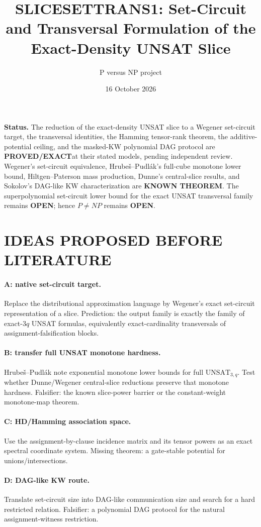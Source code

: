 \documentclass[11pt]{article}
\title{SLICESETTRANS1: Set-Circuit and Transversal Formulation of the Exact-Density UNSAT Slice}
\author{P versus NP project}
\date{16 October 2026}
\newcommand{\EXACT}{\textbf{PROVED/EXACT}}
\newcommand{\KNOWN}{\textbf{KNOWN THEOREM}}
\newcommand{\OPEN}{\textbf{OPEN}}
\begin{document}
\maketitle

\noindent\textbf{Status.} The reduction of the exact-density UNSAT slice to a Wegener set-circuit target, the transversal identities, the Hamming tensor-rank theorem, the additive-potential ceiling, and the masked-KW polynomial DAG protocol are \EXACT at their stated models, pending independent review. Wegener's set-circuit equivalence, Hrube\v{s}--Pudl\'ak's full-cube monotone lower bound, Hiltgen--Paterson mass production, Dunne's central-slice results, and Sokolov's DAG-like KW characterization are \KNOWN. The superpolynomial set-circuit lower bound for the exact UNSAT transversal family remains \OPEN; hence $P\ne NP$ remains \OPEN.

\section{IDEAS PROPOSED BEFORE LITERATURE}
\paragraph{A: native set-circuit target.} Replace the distributional approximation language by Wegener's exact set-circuit representation of a slice. Prediction: the output family is exactly the family of exact-$3q$ UNSAT formulas, equivalently exact-cardinality transversals of assignment-falsification blocks.
\paragraph{B: transfer full UNSAT monotone hardness.} Hrube\v{s}--Pudl\'ak note exponential monotone lower bounds for full $\mathrm{UNSAT}_{3,q}$. Test whether Dunne/Wegener central-slice reductions preserve that monotone hardness. Falsifier: the known slice-power barrier or the constant-weight monotone-map theorem.
\paragraph{C: HD/Hamming association space.} Use the assignment-by-clause incidence matrix and its tensor powers as an exact spectral coordinate system. Missing theorem: a gate-stable potential for unions/intersections.
\paragraph{D: DAG-like KW route.} Translate set-circuit size into DAG-like communication size and search for a hard restricted relation. Falsifier: a polynomial DAG protocol for the natural assignment-witness restriction.
\end{document}
